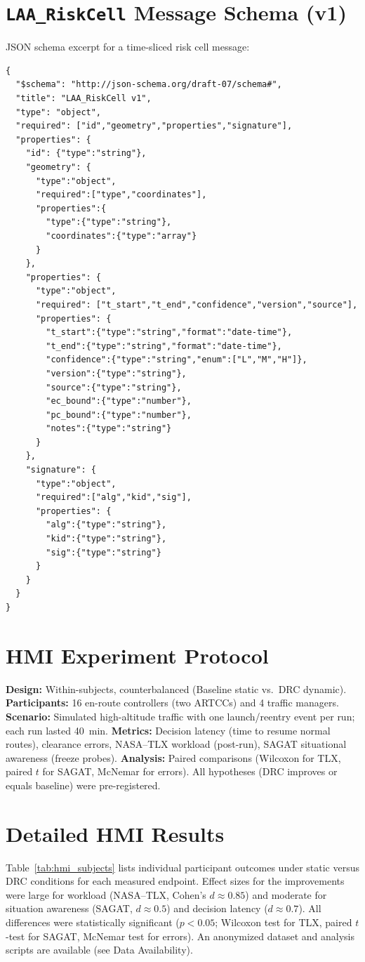 \documentclass[journal]{new-aiaa}
\newcommand{\DRC}{\textsc{DRC}}
\begin{document}
\section{\texttt{LAA\_RiskCell} Message Schema (v1)}
\label{app:schema}
JSON schema excerpt for a time-sliced risk cell message:
\begin{verbatim}
{
  "$schema": "http://json-schema.org/draft-07/schema#",
  "title": "LAA_RiskCell v1",
  "type": "object",
  "required": ["id","geometry","properties","signature"],
  "properties": {
    "id": {"type":"string"},
    "geometry": {
      "type":"object",
      "required":["type","coordinates"],
      "properties":{
        "type":{"type":"string"},
        "coordinates":{"type":"array"}
      }
    },
    "properties": {
      "type":"object",
      "required": ["t_start","t_end","confidence","version","source"],
      "properties": {
        "t_start":{"type":"string","format":"date-time"},
        "t_end":{"type":"string","format":"date-time"},
        "confidence":{"type":"string","enum":["L","M","H"]},
        "version":{"type":"string"},
        "source":{"type":"string"},
        "ec_bound":{"type":"number"},
        "pc_bound":{"type":"number"},
        "notes":{"type":"string"}
      }
    },
    "signature": {
      "type":"object",
      "required":["alg","kid","sig"],
      "properties": {
        "alg":{"type":"string"},
        "kid":{"type":"string"},
        "sig":{"type":"string"}
      }
    }
  }
}
\end{verbatim}

\section{HMI Experiment Protocol}
\label{app:hmi}
\textbf{Design:} Within-subjects, counterbalanced (Baseline static vs.\ \DRC{} dynamic). \textbf{Participants:} 16 en-route controllers (two ARTCCs) and 4 traffic managers. \textbf{Scenario:} Simulated high-altitude traffic with one launch/reentry event per run; each run lasted 40~min. \textbf{Metrics:} Decision latency (time to resume normal routes), clearance errors, NASA--TLX workload (post-run), SAGAT situational awareness (freeze probes). \textbf{Analysis:} Paired comparisons (Wilcoxon for TLX, paired $t$ for SAGAT, McNemar for errors). All hypotheses (\DRC{} improves or equals baseline) were pre-registered.

\section{Detailed HMI Results}
\label{app:hmi_results}
Table~\ref{tab:hmi_subjects} lists individual participant outcomes under static versus \DRC{} conditions for each measured endpoint. Effect sizes for the improvements were large for workload (NASA--TLX, Cohen’s $d\approx0.85$) and moderate for situation awareness (SAGAT, $d\approx0.5$) and decision latency ($d\approx0.7$). All differences were statistically significant ($p<0.05$; Wilcoxon test for TLX, paired $t$-test for SAGAT, McNemar test for errors). An anonymized dataset and analysis scripts are available (see Data Availability).
\end{document}
